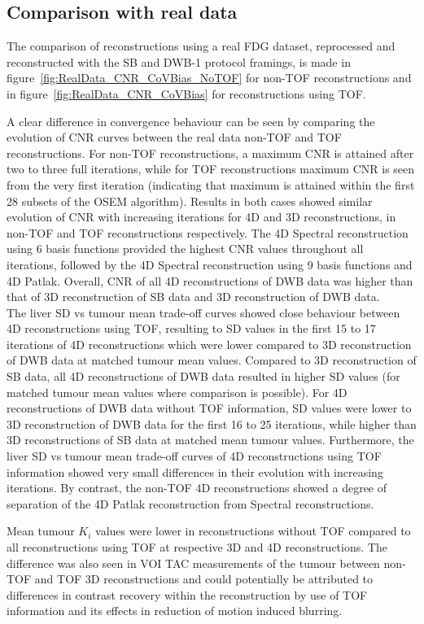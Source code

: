 \subsection{Comparison with real data}
The comparison of reconstructions using a real FDG dataset, reprocessed and reconstructed with the SB and DWB-1 protocol framings, is made in figure~\ref{fig:RealData_CNR_CoVBias_NoTOF} for non-TOF reconstructions and in figure~\ref{fig:RealData_CNR_CoVBias} for reconstructions using TOF. 

A clear difference in convergence behaviour can be seen by comparing the evolution of CNR curves between the real data non-TOF and TOF reconstructions. For non-TOF reconstructions, a maximum CNR is attained after two to three full iterations, while for TOF reconstructions maximum CNR is seen from the very first iteration (indicating that maximum is attained within the first 28 subsets of the OSEM algorithm).
Results in both cases showed similar evolution of CNR with increasing iterations for 4D and 3D reconstructions, in non-TOF and TOF reconstructions respectively.
The 4D Spectral reconstruction using 6 basis functions provided the highest CNR values throughout all iterations, followed by the 4D Spectral reconstruction using 9 basis functions and 4D Patlak. Overall, CNR of all 4D reconstructions of DWB data was higher than that of 3D reconstruction of SB data and 3D reconstruction of DWB data.\\
The liver SD vs tumour mean trade-off curves showed close behaviour between 4D reconstructions using TOF, resulting to SD values in the first 15 to 17 iterations of 4D reconstructions which were lower compared to 3D reconstruction of DWB data at matched tumour mean values. Compared to 3D reconstruction of SB data, all 4D reconstructions of DWB data resulted in higher SD values (for matched tumour mean values where comparison is possible).
For 4D reconstructions of DWB data without TOF information, SD values were lower to 3D reconstruction of DWB data for the first 16 to 25 iterations, while higher than 3D reconstructions of SB data at matched mean tumour values. 
Furthermore, the liver SD vs tumour mean trade-off curves of 4D reconstructions using TOF information showed very small differences in their evolution with increasing iterations. By contrast, the non-TOF 4D reconstructions showed a degree of separation of the 4D Patlak reconstruction from Spectral reconstructions.

Mean tumour $K_i$ values were lower in reconstructions without TOF compared to all reconstructions using TOF at respective 3D and 4D reconstructions. The difference was also seen in VOI TAC measurements of the tumour between non-TOF and TOF 3D reconstructions and could potentially be attributed to differences in contrast recovery within the reconstruction by use of TOF information and its effects in reduction of motion induced blurring.

